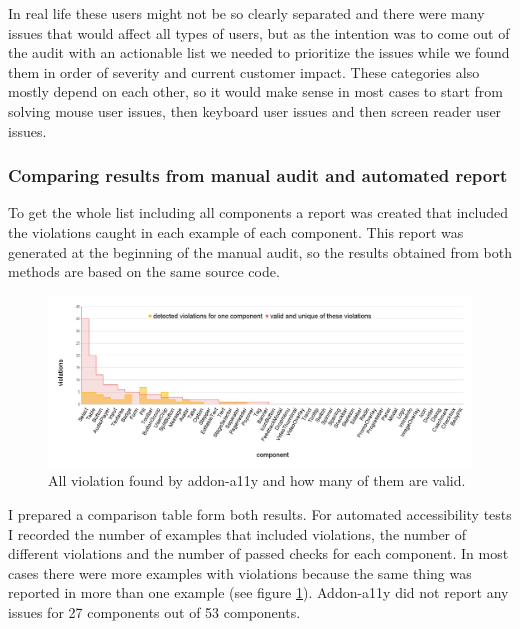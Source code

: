 \documentclass{master_thesis}
\begin{document}
In real life these users might not be so clearly separated and there were many issues that would affect all types of users, but as the intention was to come out of the audit with an actionable list we needed to prioritize the issues while we found them in order of severity and current customer impact. These categories also mostly depend on each other, so it would make sense in most cases to start from solving mouse user issues, then keyboard user issues and then screen reader user issues.

\subsubsection{Comparing results from manual audit and automated report}

To get the whole list including all components a report was created that included the violations caught in each example of each component. This report was generated at the beginning of the manual audit, so the results obtained from both methods are based on the same source code.
\begin{figure}[H]
	\includegraphics[width=\textwidth]{img/audit-failed.png}
	\caption{All violation found by addon-a11y and how many of them are valid.}
	\label{fig:audit-failed}
\end{figure}

I prepared a comparison table form both results. For automated accessibility tests I recorded the number of examples that included violations, the number of different violations and the number of passed checks for each component. In most cases there were more examples with violations because the same thing was reported in more than one example (see figure \ref{fig:audit-failed}). Addon-a11y did not report any issues for 27 components out of 53 components.
\end{document}
